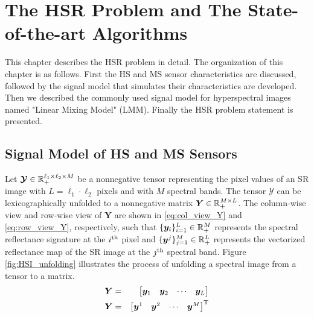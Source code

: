 \chapter{The HSR Problem and The State-of-the-art Algorithms}

This chapter describes the HSR problem in detail.
The organization of this chapter is as follows.
First the HS and MS sensor characteristics are discussed, followed by the
signal model that simulates their characteristics are developed.
Then we described the commonly used signal model for hyperspectral images
named "Linear Mixing Model" (LMM).
Finally the HSR problem statement is presented.


\section{Signal Model of HS and MS Sensors}
Let $\bm{\mathcal Y} \in \mathbb R_+^{\ell_1 \times \ell_2 \times M}$ be a
nonnegative tensor representing the pixel values of an SR image with
$L = \ell_1 \cdot \ell_2$ pixels and with $M$ spectral bands.
The tensor $\bm{\mathcal Y}$ can be lexicographically unfolded to a
nonnegative matrix $\bm Y \in \mathbb R_+^{M \times L}$.
The column-wise view and row-wise view of $\bm Y$ are shown in
\eqref{eq:col_view_Y} and \eqref{eq:row_view_Y}, respectively, such that
$\{\bm y_i\}_{i=1}^L \in \mathbb R_+^M$ represents the spectral reflectance signature
at the $i^\text{th}$ pixel and $\{\bm y^j\}_{j=1}^M \in \mathbb R_+^L$ represents the
vectorized reflectance map of the SR image at the $j^\text{th}$
spectral band.
Figure \ref{fig:HSI_unfolding} illustrates the process of unfolding a spectral
image from a tensor to a matrix.
\begin{eqnarray}
    \bm Y & = & \begin{bmatrix} \bm y_1 & \bm y_2 & \cdots & \bm y_L \end{bmatrix} \label{eq:col_view_Y} \\
    \bm Y & = & \begin{bmatrix} \bm y^1 & \bm y^2 & \cdots & \bm y^M \end{bmatrix}^\text T
    \label{eq:row_view_Y}
\end{eqnarray}

